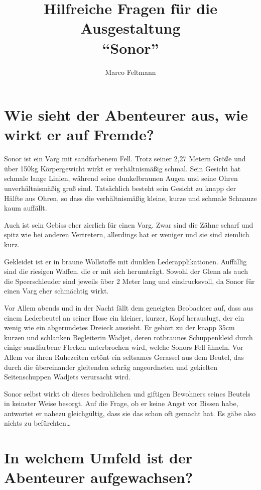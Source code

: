 \documentclass{article}
\author{Marco Feltmann}
\title{Hilfreiche Fragen für die Ausgestaltung \\ \enquote{Sonor} }
\begin{document}
	\maketitle
	
	\tableofcontents
	
	\section[Aussehen]{Wie sieht der Abenteurer aus, wie wirkt er auf Fremde?}
	
	Sonor ist ein Varg mit sandfarbenem Fell. Trotz
	seiner 2,27 Metern Größe und über 150kg Körpergewicht wirkt er
	verhältnismäßig schmal. Sein Gesicht hat schmale lange Linien, während
	seine dunkelbraunen Augen und seine Ohren unverhältnismäßig groß sind.
	Tatsächlich besteht sein Gesicht zu knapp der Hälfte aus Ohren, so dass
	die verhältnismäßig kleine, kurze und schmale Schnauze kaum auffällt.

	Auch ist sein Gebiss eher zierlich für einen Varg. Zwar sind die Zähne
	scharf und spitz wie bei anderen Vertretern, allerdings hat er
	weniger und sie sind ziemlich kurz.

	Gekleidet ist er in braune Wollstoffe mit dunklen Lederapplikationen.
	Auffällig sind die riesigen Waffen, die er mit sich herumträgt. Sowohl
	der Glenn als auch die Speerschleuder sind jeweils über 2 Meter lang und
	eindrucksvoll, da Sonor für einen Varg eher schmächtig wirkt.

	Vor Allem abends und in der Nacht fällt dem geneigten Beobachter auf,
	dass aus einem Lederbeutel an seiner Hose ein kleiner, kurzer,
	Kopf herauslugt, der ein wenig wie ein abgerundetes Dreieck aussieht.
	Er gehört zu der knapp 35cm kurzen und schlanken Begleiterin Wadjet,
	deren rotbraunes Schuppenkleid durch einige sandfarbene Flecken
	unterbrochen wird, welche Sonors Fell ähneln.
	Vor Allem vor ihren Ruhezeiten ertönt ein seltsames Gerassel aus dem
	Beutel, das durch die übereinander gleitenden schräg angeordneten und
	gekielten Seitenschuppen Wadjets verursacht wird.

	Sonor selbst wirkt ob dieses bedrohlichen und giftigen Bewohners seines
	Beutels in keinster Weise besorgt. Auf die Frage, ob er keine Angst vor
	Bissen habe, antwortet er nahezu gleichgültig, dass sie das schon oft
	gemacht hat. Es gäbe also nichts zu befürchten\ldots

	
	\section[Soziales Umfeld]{In welchem Umfeld ist der Abenteurer aufgewachsen?}
	
\end{document}
